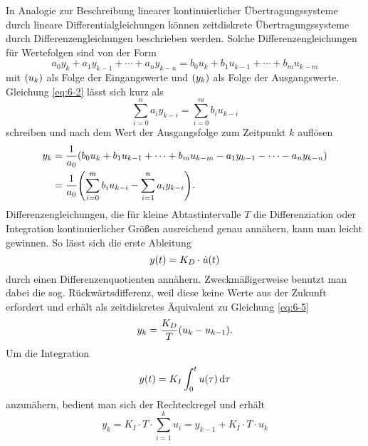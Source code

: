 In Analogie zur Beschreibung linearer kontinuierlicher Übertragungssysteme durch lineare Differentialgleichungen können zeitdiskrete Übertragungssysteme durch Differenzengleichungen beschrieben werden.
Solche Differenzengleichungen für Wertefolgen sind von der Form
\begin{equation}\label{eq:6-2}
	a_0 y_k + a_1 y_{k - 1} + \cdots + a_n y_{k - n} = b_0 u_k + b_1 u_{k - 1} + \cdots + b_m u_{k - m}
\end{equation}
mit \(\parentheses*{u_k}\) als Folge der Eingangswerte und \(\parentheses*{y_k}\) als Folge der Ausgangswerte.
Gleichung \eqref{eq:6-2} lässt sich kurz als
\begin{equation}\label{eq:6-3}
	\sum_{i = 0}^n a_i y_{k - i} = \sum_{i = 0}^m b_i u_{k - i}
\end{equation}
schreiben und nach dem Wert der Ausgangsfolge zum Zeitpunkt \(k\) auflösen
\begin{align}
	\begin{split}
		y_k &= \frac{1}{a_0}\parentheses*{b_0 u_k + b_1 u_{k - 1} + \cdots + b_m u_{k - m} - a_1 y_{k - 1} - \cdots - a_n y_{k - n}}\\
		&= \frac{1}{a_0}\parentheses*{\sum_{i = 0}^m b_i u_{k - i} - \sum_{i = 1}^n a_i y_{k - i}}.
	\end{split}
\end{align}
Differenzengleichungen, die für kleine Abtastintervalle \(T\) die Differenziation oder Integration kontinuierlicher Größen ausreichend genau annähern, kann man leicht gewinnen.
So lässt sich die erste Ableitung
\begin{equation}\label{eq:6-5}
	y\parentheses*{t} = K_D \cdot \dot{u}\parentheses*{t}
\end{equation}
durch einen Differenzenquotienten annähern.
Zweckmäßigerweise benutzt man dabei die sog. Rückwärtsdifferenz, weil diese keine Werte aus der Zukunft erfordert und erhält als zeitdiskretes Äquivalent zu Gleichung \eqref{eq:6-5}
\begin{equation}\label{eq:6-6}
	y_k = \frac{K_D}{T}\parentheses*{u_k - u_{k - 1}}.
\end{equation}
Um die Integration
\begin{equation}
	y\parentheses*{t} = K_I \int_0^t u\parentheses*{\tau}\d\tau
\end{equation}
anzunähern, bedient man sich der Rechteckregel und erhält
\begin{equation}
	y_k = K_I \cdot T \cdot \sum_{i = 1}^k u_i = y_{k - 1} + K_I \cdot T \cdot u_k
\end{equation}
